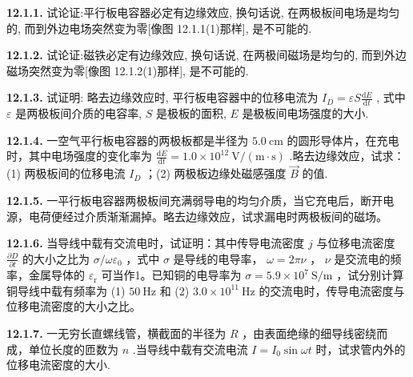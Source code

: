 \textbf{12.1.1.} 试论证:平行板电容器必定有边缘效应, 换句话说, 在两极板间电场是均匀的, 而到外边电场突然变为零[像图 12.1.1(1)那样], 是不可能的.

\begin{center}
\end{center}

\vfill
\newpage

\textbf{12.1.2.} 试论证:磁铁必定有边缘效应, 换句话说, 在两极间磁场是均匀的, 而到外边磁场突然变为零[像图 12.1.2(1)那样], 是不可能的.

\begin{center}
\end{center}

\vfill
\newpage

\textbf{12.1.3.} 试证明: 略去边缘效应时, 平行板电容器中的位移电流为 $\displaystyle I_{D} = \varepsilon S \frac{\mathrm{d}E}{\mathrm{d}t}$ , 式中 $\varepsilon$ 是两极板间介质的电容率, $S$ 是极板的面积, $E$ 是极板间电场强度的大小.

\vfill
\newpage

\textbf{12.1.4.} 一空气平行板电容器的两极板都是半径为 $5.0\mathrm{~cm}$ 的圆形导体片，在充电时，其中电场强度的变化率为 $\displaystyle \frac{\mathrm{d}E}{\mathrm{d}t} = 1.0\times 10^{12}\mathrm{~V/(m\cdot s)}$ .略去边缘效应，试求：(1) 两极板间的位移电流 $I_{D}$ ；(2) 两极板边缘处磁感强度 $\vec{B}$ 的值.

\vfill
\newpage

\textbf{12.1.5.} 一平行板电容器两极板间充满弱导电的均匀介质，当它充电后，断开电源，电荷便经过介质渐渐漏掉。略去边缘效应，试求漏电时两极板间的磁场。

\vfill
\newpage

\textbf{12.1.6.} 当导线中载有交流电时，试证明：其中传导电流密度 $j$ 与位移电流密度 $\displaystyle \frac{\partial D}{\partial t}$ 的大小之比为 $\sigma / \omega \varepsilon_0$ ，式中 $\sigma$ 是导线的电导率， $\omega = 2\pi \nu$ ， $\nu$ 是交流电的频率，金属导体的 $\varepsilon_{\mathrm{r}}$ 可当作1。已知铜的电导率为 $\sigma = 5.9 \times 10^7 \mathrm{~S/m}$ ，试分别计算铜导线中载有频率为 (1) $50\mathrm{~Hz}$ 和 (2) $3.0 \times 10^{11}\mathrm{~Hz}$ 的交流电时，传导电流密度与位移电流密度的大小之比。

\vfill
\newpage

\textbf{12.1.7.} 一无穷长直螺线管，横截面的半径为 $R$ ，由表面绝缘的细导线密绕而成，单位长度的匝数为 $n$ .当导线中载有交流电流 $I = I_0\sin \omega t$ 时，试求管内外的位移电流密度的大小.

